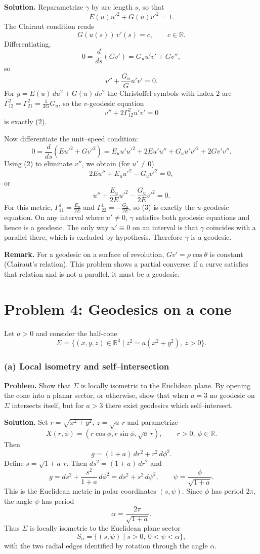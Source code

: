 \documentclass[12pt,a4paper]{article}
\theoremstyle{plain}
\theoremstyle{definition}      %
\begin{document}
\medskip
\textbf{Solution.}
Reparametrize $\gamma$ by arc length $s$, so that
\[
E(u)u'^2 + G(u)v'^2 = 1.
\]
The Clairaut condition reads
\[
G(u(s))\,v'(s) = c,\qquad c\in\mathbb R.
\tag{1}
\]
Differentiating,
\[
0 = \frac{d}{ds}(G v')
= G_u u' v' + G v'',
\]
so
\[
v'' + \frac{G_u}{G}u'v' = 0.
\tag{2}
\]
For $g=E(u)\,du^2+G(u)\,dv^2$ the Christoffel symbols with index $2$ are
$\Gamma^2_{12}=\Gamma^2_{21} = \frac{1}{2G}G_u$, so the $v$-geodesic equation
\[
v'' + 2\Gamma^2_{12}u'v' = 0
\]
is exactly (2).

Now differentiate the unit--speed condition:
\[
0 = \frac{d}{ds}(E u'^2 + G v'^2)
= E_u u' u'^2 + 2E u'u'' + G_u u' v'^2 + 2G v'v''.
\]
Using (2) to eliminate $v''$, we obtain (for $u'\neq0$)
\[
2E u'' + E_u u'^2 - G_u v'^2 = 0,
\]
or
\[
u'' + \frac{E_u}{2E}u'^2 - \frac{G_u}{2E}v'^2 = 0.
\tag{3}
\]
For this metric, $\Gamma^1_{11}=\frac{E_u}{2E}$ and
$\Gamma^1_{22}=-\frac{G_u}{2E}$, so (3) is exactly the $u$-geodesic
equation. On any interval where $u'\neq0$, $\gamma$ satisfies both
geodesic equations and hence is a geodesic. The only way $u'\equiv0$
on an interval is that $\gamma$ coincides with a parallel there, which
is excluded by hypothesis. Therefore $\gamma$ is a geodesic.

\medskip
\textbf{Remark.}
For a geodesic on a surface of revolution, $G v'=\rho\cos\theta$ is constant
(Clairaut's relation). This problem shows a partial converse: if a curve
satisfies that relation and is not a parallel, it must be a geodesic.

\section*{Problem 4: Geodesics on a cone}

Let $a>0$ and consider the half-cone
\[
\Sigma = \{(x,y,z)\in\mathbb R^3 \mid z^2 = a(x^2+y^2),\ z>0\}.
\]

\subsubsection*{(a) Local isometry and self--intersection}

\textbf{Problem.}
Show that $\Sigma$ is locally isometric to the Euclidean plane.
By opening the cone into a planar sector, or otherwise, show that
when $a=3$ no geodesic on $\Sigma$ intersects itself, but for $a>3$
there exist geodesics which self--intersect.

\medskip
\textbf{Solution.}
Set $r=\sqrt{x^2+y^2}$, $z=\sqrt{a}\,r$ and parametrize
\[
X(r,\phi) = (r\cos\phi,r\sin\phi,\sqrt{a}\,r),\qquad r>0,\ \phi\in\mathbb R.
\]
Then
\[
g = (1+a)\,dr^2 + r^2\,d\phi^2.
\]
Define $s=\sqrt{1+a}\,r$. Then $ds^2=(1+a)\,dr^2$ and
\[
g = ds^2 + \frac{s^2}{1+a}\,d\phi^2
= ds^2 + s^2\,d\psi^2,\qquad \psi=\frac{\phi}{\sqrt{1+a}}.
\]
This is the Euclidean metric in polar coordinates $(s,\psi)$.
Since $\phi$ has period $2\pi$, the angle $\psi$ has period
\[
\alpha = \frac{2\pi}{\sqrt{1+a}}.
\]
Thus $\Sigma$ is locally isometric to the Euclidean plane sector
\[
S_\alpha = \{(s,\psi) \mid s>0,\ 0<\psi<\alpha\},
\]
with the two radial edges identified by rotation through the angle $\alpha$.
\end{document}
